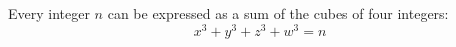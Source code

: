 \begin{conjecture}
    Every integer $n$ can be expressed as a sum of the cubes of four integers:
\[
    x^3+y^3+z^3+w^3=n
\]
\end{conjecture}
